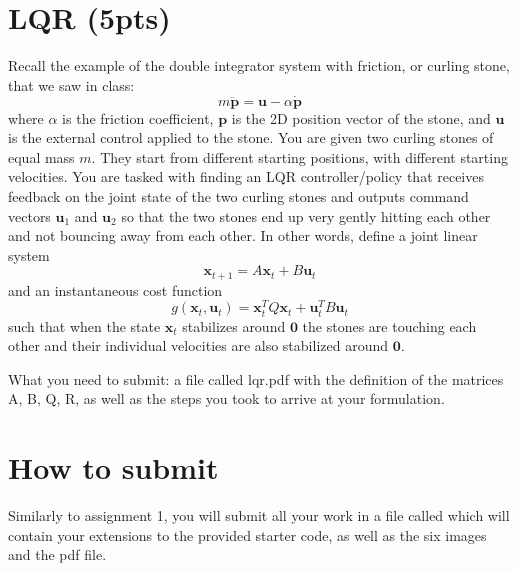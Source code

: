 \documentclass[11pt, a4paper]{article}
\begin{document}
\section{LQR (5pts)}
Recall the example of the double integrator system with friction, or curling stone, that we saw in class:
\begin{equation}
m\ddot{\textbf{p}} = \textbf{u}-\alpha \dot{\textbf{p}} \nonumber
\end{equation}
\noindent where $\alpha$ is the friction coefficient, $\textbf{p}$ is the 2D position vector of the stone, and $\textbf{u}$ is the external control applied to the stone. 
You are given two curling stones of equal mass $m$. They start from different starting positions, with different starting velocities. You are tasked with finding an LQR 
controller/policy that receives feedback on the joint state of the two curling stones and outputs command vectors $\textbf{u}_1$ and $\textbf{u}_2$ so that the two stones 
end up very gently hitting each other and not bouncing away from each other. In other words, define a joint linear system 
\begin{equation}
  \textbf{x}_{t+1} = A\textbf{x}_t + B\textbf{u}_t
\end{equation}
\noindent and an instantaneous cost function
\begin{equation}
  g(\textbf{x}_t, \textbf{u}_t) = \textbf{x}^T_tQ\textbf{x}_t + \textbf{u}^T_tB\textbf{u}_t
\end{equation}
\noindent such that when the state $\textbf{x}_t$ stabilizes around $\textbf{0}$ the stones are touching each other and their individual velocities are also 
stabilized around $\textbf{0}$.

What you need to submit: a file called lqr.pdf with the definition of the matrices A, B, Q, R, as well as the steps you took to arrive at your formulation.    

\section{How to submit}
Similarly to assignment 1, you will submit all your work in a file called  which will contain
your extensions to the provided starter code, as well as the six images and the pdf file. 


\end{document}
